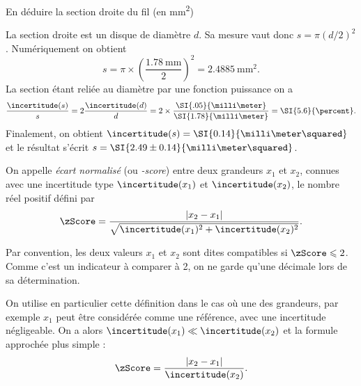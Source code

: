 


\begin{enonce}
En déduire la section droite du fil (en \si{\milli\meter\squared})
\end{enonce}


\begin{corrige}
La section droite est un disque de diamètre $d$. Sa mesure vaut donc \(s=\pi(d/2)^2\). Numériquement on obtient 
\[
s=\pi\times \left(\frac{\SI{1.78}{\milli\meter}}{2}\right)^2
=\SI{2.4885}{\milli\meter\squared}.
\]
La section étant reliée au diamètre par une fonction puissance on a 
\[
\frac{\incertitude(s)}{s}=
2\frac{\incertitude(d)}{d}=
2\times\frac{\SI{.05}{\milli\meter}}{\SI{1.78}{\milli\meter}}=
\SI{5.6}{\percent}.
\]
Finalement, on obtient \(\incertitude(s)=\SI{0.14}{\milli\meter\squared}\) et le résultat s'écrit \(s=\SI{2.49\pm 0.14}{\milli\meter\squared}\).
\end{corrige}


\finEntrainement






\bigskip

\begin{prerequis}
On appelle \emph{écart normalisé} (ou \emph{\zScore-score}) entre deux grandeurs $x_1$ et $x_2$,
connues avec une incertitude type $\incertitude(x_1)$ et $\incertitude(x_2)$, le nombre réel positif défini par
\[
  \zScore = \frac{|x_2 - x_1|}{\sqrt{\incertitude(x_1)^2 + \incertitude(x_2)^2}}.
\]
 
Par convention, les deux valeurs $x_1$ et $x_2$ sont dites compatibles si
$\zScore \leqslant 2$.
Comme c'est un indicateur à comparer à 2, on ne garde qu'une décimale lors de sa détermination.

\smallskip

On utilise en particulier cette définition dans le cas où une  des grandeurs, par exemple $x_1$ peut être considérée comme une référence, avec une incertitude négligeable. On a alors  \(\incertitude(x_1) \ll \incertitude(x_2)\) et la formule approchée plus simple : 
\[
\zScore = \frac{|x_2 - x_1|}{\incertitude(x_2)}.
\]
\end{prerequis}




